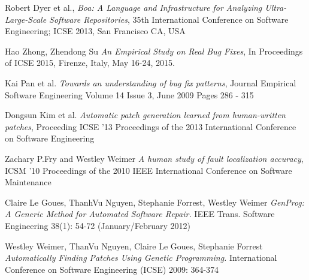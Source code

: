 \documentclass{sig-alternate-05-2015}
\begin{document}
\begin{thebibliography}{9}

  Robert Dyer et al.,
  \emph{Boa: A Language and Infrastructure for Analyzing Ultra-Large-Scale Software Repositories},
35th International Conference on Software Engineering; ICSE 2013, San Francisco CA, USA

Hao Zhong, Zhendong Su
\emph{An Empirical Study on Real Bug Fixes},
In Proceedings of ICSE 2015, Firenze, Italy, May 16-24, 2015.

Kai Pan et al.
\emph{Towards an understanding of bug fix patterns},
Journal
Empirical Software Engineering
Volume 14 Issue 3, June 2009 
Pages 286 - 315 

Dongsun Kim et al.
\emph{Automatic patch generation learned from human-written patches},
Proceeding
ICSE '13 Proceedings of the 2013 International Conference on Software Engineering

Zachary P.Fry and Westley Weimer
\emph{A human study of fault localization accuracy},
ICSM '10 Proceedings of the 2010 IEEE International Conference on Software Maintenance

Claire Le Goues, ThanhVu Nguyen, Stephanie Forrest, Westley Weimer
\emph{GenProg: A Generic Method for Automated Software Repair.} 
IEEE Trans. Software Engineering 38(1): 54-72 (January/February 2012) 

Westley Weimer, ThanVu Nguyen, Claire Le Goues, Stephanie Forrest
\emph{Automatically Finding Patches Using Genetic Programming.}
International Conference on Software Engineering (ICSE) 2009: 364-374

\end{thebibliography}

\end{document}
